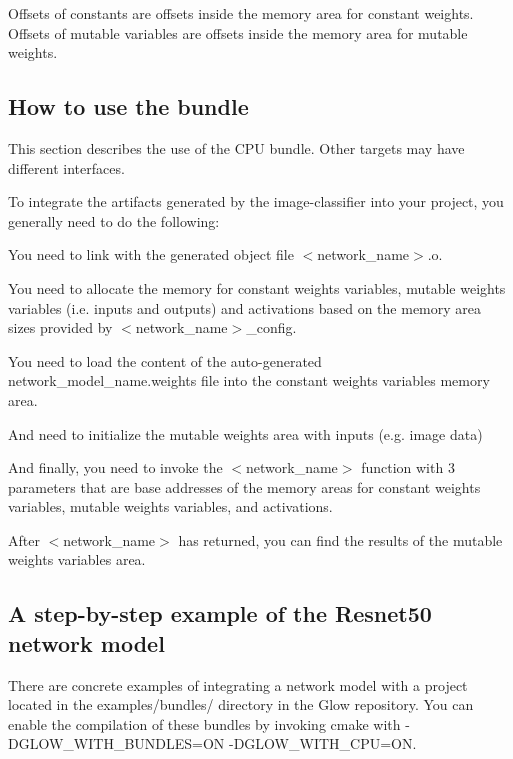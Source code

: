 Offsets of constants are offsets inside the memory area for constant weights. Offsets of mutable variables are offsets inside the memory area for mutable weights.

\subsection*{How to use the bundle}

This section describes the use of the C\+PU bundle. Other targets may have different interfaces.

To integrate the artifacts generated by the image-\/classifier into your project, you generally need to do the following\+:
\begin{DoxyItemize}
\item You need to link with the generated object file {\ttfamily $<$network\+\_\+name$>$.o}.
\item You need to allocate the memory for constant weights variables, mutable weights variables (i.\+e. inputs and outputs) and activations based on the memory area sizes provided by {\ttfamily $<$network\+\_\+name$>$\+\_\+config}.
\item You need to load the content of the auto-\/generated {\ttfamily network\+\_\+model\+\_\+name.\+weights} file into the constant weights variables memory area.
\item And need to initialize the mutable weights area with inputs (e.\+g. image data)
\item And finally, you need to invoke the {\ttfamily $<$network\+\_\+name$>$} function with 3 parameters that are base addresses of the memory areas for constant weights variables, mutable weights variables, and activations.
\item After {\ttfamily $<$network\+\_\+name$>$} has returned, you can find the results of the mutable weights variables area.
\end{DoxyItemize}

\subsection*{A step-\/by-\/step example of the Resnet50 network model}

There are concrete examples of integrating a network model with a project located in the {\ttfamily examples/bundles/} directory in the Glow repository. You can enable the compilation of these bundles by invoking {\ttfamily cmake} with {\ttfamily -\/\+D\+G\+L\+O\+W\+\_\+\+W\+I\+T\+H\+\_\+\+B\+U\+N\+D\+L\+ES=ON -\/\+D\+G\+L\+O\+W\+\_\+\+W\+I\+T\+H\+\_\+\+C\+PU=ON}.


